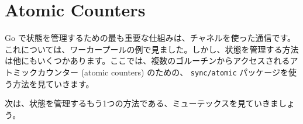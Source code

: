 \section{Atomic Counters}

Go で状態を管理するための最も重要な仕組みは、チャネルを使った通信です。これについては、ワーカープールの例で見ました。しかし、状態を管理する方法は他にもいくつかあります。ここでは、複数のゴルーチンからアクセスされるアトミックカウンター (atomic counters) のための、 \texttt{sync/atomic} パッケージを使う方法を見ていきます。




次は、状態を管理するもう1つの方法である、ミューテックスを見ていきましょう。
